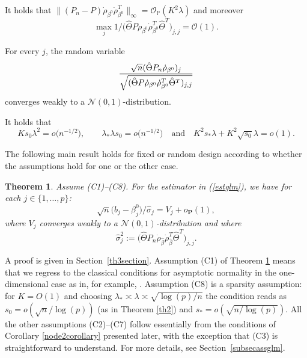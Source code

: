 \documentclass[aos,MSNbibl,dvips]{arximspdf}
\def\cal{\mathcal}
\newtheorem{theo}{Theorem}[section]
\newcommand{\PP}{\mathbb{P}}
\begin{document}
\begin{longlist}[(C1)]
\item[(C6)] It holds that
$ \| (P_n - P) \dot\rho_{\beta^0} \dot\rho_{\beta^0 }^T \|
_{\infty}=
{\mathcal O}_{\PP} (K^2 \lambda) $ and
moreover
%
\[
\max_j 1/\bigl(\hat\Theta P \dot\rho_{\beta^0} \dot
\rho_{\beta^0 }^T \hat \Theta^T\bigr)_{j,j}
= {\mathcal O} (1).
\]

\item[(C7)] For every $j$, the random variable
%
\[
{ \sqrt n ( \hat\Theta P_n \dot\rho_{\beta^0} )_j \over\sqrt{ (
\hat\Theta P \dot\rho_{\beta^0} \dot\rho_{\beta^0 }^T \hat
{\Theta}^T
)_{j,j} }} %
\]
%
converges weakly to a ${\cal N}(0,1)$-distribution.


\item[(C8)] It holds that
%
\[
K s_0 \lambda^2 =o \bigl(n^{-{1/2}} \bigr),\qquad
\lambda_* \lambda s_0 =o \bigl(n^{-{1/2}} \bigr) \quad\mbox{and}\quad
K^2 s_* \lambda+ K^2 \sqrt{s_0} \lambda= o(1).
\]
\end{longlist}
%
The following main result holds for fixed or random design according to
whether the assumptions hold for one or the other case.
%
\begin{theo} \label{th3}
Assume \textup{(C1)--(C8)}. For the estimator in (\ref{estglm}), we have for
each $j
\in\{1,\ldots,p\}$:
%
\[
\sqrt{n}\bigl(\hat{b}_j - \beta_{j}^0\bigr)/
\hat{\sigma}_j = V_j + o_\mathbf {P} (1),
\]
%
where $V_j $ converges weakly to a ${\cal N}(0,1)$-distribution and
where
%
\[
\hat\sigma_j^2:= \bigl( \hat\Theta P_n
\dot\rho_{\hat\beta} \dot \rho_{\hat\beta}^T \hat{
\Theta}^T \bigr)_{j,j}. %
\]
%
\end{theo}
%
A proof is given in Section~\ref{th3section}.
%
%
Assumption (C1) of Theorem \ref{th3} means that we regress to the classical
conditions for asymptotic normality in the one-dimensional case as in, for
example, \cite{cramer1946mathematical}. Assumption (C8) is a sparsity
assumption: for $K = O(1)$ and choosing $\lambda_* \asymp
\lambda\asymp\sqrt{\log(p)/n}$ the condition reads as $s_0 =
o(\sqrt{n}/\log(p))$ (as in Theorem \ref{th2}) and $s_* = o(\sqrt
{n/\log
(p)})$. All the other assumptions (C2)--(C7)
follow essentially from the conditions of Corollary \ref{node2corollary}
presented later, with the exception that (C3) is straightforward to
understand. For more details, see Section~\ref{subsecassglm}.
\end{document}
